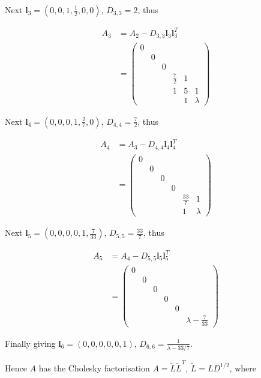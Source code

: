 \documentclass[a4paper]{article}
\begin{document}
Next $ \mathbf{l}_{3} = (0,0,1,\frac{1}{2},0,0) $, $ D_{3,3} = 2 $, thus

\begin{align*}
A_{3} & = A_{2} - D_{3,3} \mathbf{l}_{3} \mathbf{l}_{3}^{T} \\
& = \begin{pmatrix}
0 & & & & & \\
& 0 &  & & & \\
& & 0 & & & \\
& & & \frac{7}{2} & 1 & \\
& & & 1 & 5 & 1 \\
& & & & 1 & \lambda
\end{pmatrix}
\end{align*}

Next $ \mathbf{l}_{4} = (0,0,0,1,\frac{2}{7},0) $, $ D_{4,4} = \frac{7}{2} $, thus

\begin{align*}
A_{4} & = A_{3} - D_{4,4} \mathbf{l}_{4} \mathbf{l}_{4}^{T} \\
& = \begin{pmatrix}
0 & & & & & \\
& 0 &  & & & \\
& & 0 & & & \\
& & & 0 & & \\
& & & & \frac{33}{7} & 1 \\
& & & & 1 & \lambda
\end{pmatrix}
\end{align*}

Next $ \mathbf{l}_{5} = (0,0,0,0,1,\frac{7}{33}) $, $ D_{5,5} = \frac{33}{7} $, thus

\begin{align*}
A_{5} & = A_{4} - D_{5,5} \mathbf{l}_{5} \mathbf{l}_{5}^{T} \\
& = \begin{pmatrix}
0 & & & & & \\
& 0 &  & & & \\
& & 0 & & & \\
& & & 0 & & \\
& & & & 0 & \\
& & & & & \lambda - \frac{7}{33}
\end{pmatrix}
\end{align*}

Finally giving  $ \mathbf{l}_{6} = (0,0,0,0,0,1) $, $ D_{6,6} = \frac{1}{\lambda  - 33/7} $.

Hence $ A $ has the Cholesky factorisation $ A = \tilde{L} \tilde{L}^{T} $,  $ \tilde{L} = L D^{1/2} $, where
\end{document}
